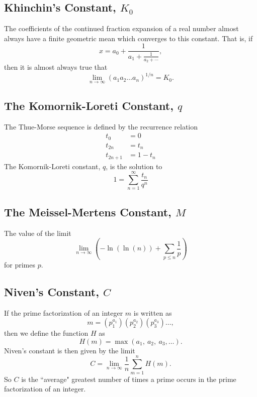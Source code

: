 \documentclass[12pt]{article}
\begin{document}
\subsection{Khinchin's Constant, $K_{0}$}
The coefficients of the continued fraction expansion of a real number almost always have a finite geometric mean which converges to this constant. That is, if 
\begin{equation*}
x = a_{0} + \frac{1}{a_{1} + \frac{1}{a_{2} + \cdots}},
\end{equation*}
then it is almost always true that
\begin{equation*}
\lim_{n \rightarrow \infty}(a_{1} a_{2} \ldots a_{n})^{1/n} = K_{0}.
\end{equation*}

\subsection{The Komornik-Loreti Constant, $q$}
The Thue-Morse sequence is defined by the recurrence relation
\begin{align*}
t_{0} &= 0\\
t_{2n} &= t_{n}\\
t_{2n+1} &= 1 - t_{n}
\end{align*}
The Komornik-Loreti constant, $q$, is the solution to
\begin{equation*}
1 = \sum_{n=1}^{\infty} \frac{t_{n}}{q^{n}}
\end{equation*}

\subsection{The Meissel-Mertens Constant, $M$}
The value of the limit
\begin{equation*}
\lim_{n \rightarrow \infty} \left( -\ln\left( \ln(n) \right) + \sum_{p \leq n} \frac{1}{p} \right)
\end{equation*}
for primes $p$. 

\subsection{Niven's Constant, $C$}
If the prime factorization of an integer $m$ is written as
\begin{equation*}
m = (p_{1}^{a_{1}})(p_{2}^{a_{2}})(p_{3}^{a_{3}}) \ldots ,
\end{equation*}
then we define the function $H$ as
\begin{equation*}
H(m) = \max(a_{1},\: a_{2},\: a_{3}, \ldots) .
\end{equation*}
Niven's constant is then given by the limit
\begin{equation*}
C = \lim_{n \rightarrow \infty} \frac{1}{n} \sum_{m = 1}^{n} H(m) .
\end{equation*}
So $C$ is the ``average" greatest number of times a prime occurs in the prime factorization of an integer.
\end{document}
